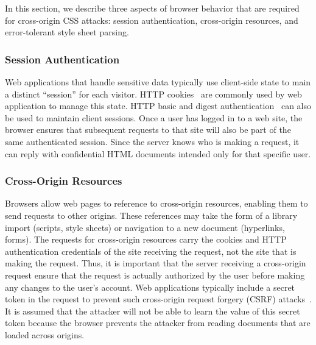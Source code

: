 \documentclass{acm_proc_article-sp}
\begin{document}
In this section, we describe three aspects of browser behavior that are required for cross-origin CSS attacks: session authentication, cross-origin resources, and error-tolerant style sheet parsing.

\subsubsection{Session Authentication}
Web applications that handle sensitive data typically use client-side state to
main a distinct ``session'' for each visitor. HTTP cookies~\cite{rfc2109,
httpstate} are commonly used by web application to manage this state. HTTP
basic and digest authentication~\cite{rfc2617} can also be used to maintain
client sessions. Once a user has logged in to a web site, the browser ensures
that subsequent requests to that site will also be part of the same
authenticated session. Since the server knows who is making a request, it can
reply with confidential HTML documents intended only for that specific user.

\subsubsection{Cross-Origin Resources}
Browsers allow web pages to reference to cross-origin resources, enabling them to send requests to other origins. These references may take the form of a library import (scripts, style sheets) or navigation to a new document (hyperlinks, forms). The requests for cross-origin resources carry the cookies and HTTP authentication credentials of the site receiving the request, not the site that is making the request. Thus, it is important that the server receiving a cross-origin request ensure that the request is actually authorized by the user before making any changes to the user's account. Web applications typically include a secret token in the request to prevent such cross-origin request forgery (CSRF) attacks~\cite{csrf}. It is assumed that the attacker will not be able to learn the value of this secret token because the browser prevents the attacker from reading documents that are loaded across origins.


% 
% 
% 
% 
% 
% 
\end{document}
